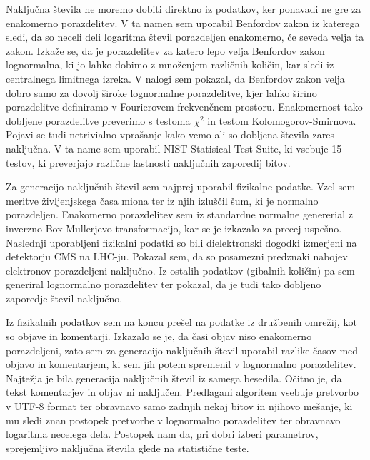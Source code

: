 \documentclass[11pt, oneside]{article}
\theoremstyle{definition}
\begin{document}
Naključna števila ne moremo dobiti direktno iz podatkov, ker ponavadi ne gre za enakomerno porazdelitev.
V ta namen sem uporabil Benfordov zakon iz katerega sledi, da so neceli deli logaritma števil porazdeljen enakomerno,
če seveda velja ta zakon. Izkaže se, da je porazdelitev za katero lepo velja Benfordov zakon lognormalna, ki
jo lahko dobimo z množenjem različnih količin, kar sledi iz centralnega limitnega izreka.
V nalogi sem pokazal, da Benfordov zakon velja dobro samo za dovolj široke lognormalne porazdelitve, kjer lahko
širino porazdelitve definiramo v Fourierovem frekvenčnem prostoru. Enakomernost tako dobljene
porazdelitve preverimo s testoma $\chi^2$ in testom Kolomogorov-Smirnova. Pojavi se tudi netrivialno vprašanje kako
vemo ali so dobljena števila zares naključna. V ta name sem uporabil NIST Statisical  Test  Suite, ki vsebuje
15 testov, ki preverjajo različne lastnosti naključnih zaporedij bitov.

Za generacijo naključnih števil sem najprej uporabil fizikalne podatke. Vzel sem meritve življenjskega
časa miona ter iz njih izluščil šum, ki je normalno porazdeljen. Enakomerno porazdelitev
sem iz standardne normalne genererial z inverzno Box-Mullerjevo transformacijo, kar se je izkazalo za precej uspešno.
Naslednji uporabljeni fizikalni podatki so bili dielektronski dogodki izmerjeni na detektorju CMS na LHC-ju.
Pokazal sem, da so posamezni predznaki nabojev elektronov porazdeljeni naključno. Iz ostalih podatkov (gibalnih količin)
pa sem generiral lognormalno porazdelitev ter pokazal, da je tudi tako dobljeno zaporedje števil naključno.

Iz fizikalnih podatkov sem na koncu prešel na podatke iz družbenih omrežij, kot so objave in komentarji.
Izkazalo se je, da časi objav niso enakomerno porazdeljeni, zato sem za generacijo naključnih števil uporabil
razlike časov med objavo in komentarjem, ki sem jih potem spremenil v lognormalno porazdelitev.
Najtežja je bila generacija naključnih števil iz samega besedila. Očitno je, da tekst komentarjev in
objav ni naključen. Predlagani algoritem vsebuje pretvorbo v UTF-8 format ter obravnavo samo zadnjih nekaj bitov in
njihovo mešanje, ki mu sledi znan postopek pretvorbe v lognormalno porazdelitev ter obravnavo logaritma
necelega dela. Postopek nam da, pri dobri izberi parametrov, sprejemljivo naključna števila glede na statistične teste.

\newpage

\nocite{*}
\printbibliography[title={Literatura}]
\end{document}
